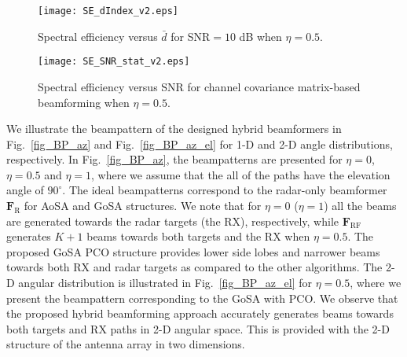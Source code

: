 \documentclass[journal,10pt]{IEEEtran}
\begin{document}
	
	
	\begin{figure}[t]
		\centering
		{\texttt{[image: SE\_dIndex\_v2.eps]} } 
		\caption{\color{black}Spectral efficiency versus $\bar{d}$ for SNR$=10$ dB when $\eta = 0.5$. 
		}
		\label{fig_SE_SNR_dbar}
	\end{figure}
	
	
	
	
	
	\begin{figure}[t]
		\centering
		{\texttt{[image: SE\_SNR\_stat\_v2.eps]} } 
		\caption{\color{black}Spectral efficiency versus SNR for channel covariance matrix-based beamforming when $\eta = 0.5$. 
		}
		\label{fig_SE_SNR_CCM}
	\end{figure}
	
	
	We illustrate the beampattern of the designed hybrid beamformers in Fig.~\ref{fig_BP_az} and Fig.~\ref{fig_BP_az_el} for 1-D and 2-D angle distributions, respectively. In Fig.~\ref{fig_BP_az}, the beampatterns are presented for $\eta = 0$, $\eta = 0.5$ and $\eta = 1$, where we assume that the all of the paths have the elevation angle of $90^\circ$. The ideal beampatterns correspond to the radar-only beamformer $\mathbf{F}_\mathrm{R}$ for AoSA and GoSA structures. We note that for $\eta =0$ ($\eta = 1$) all the beams are generated towards the radar targets (the RX), respectively, while $\mathbf{F}_\mathrm{RF}$ generates $K+1$ beams towards both targets and the RX when $\eta =0.5$. The proposed GoSA PCO structure provides lower side lobes and narrower beams towards both RX and radar targets as compared to the other algorithms. The 2-D angular distribution is illustrated in Fig.~\ref{fig_BP_az_el} for $\eta =0.5$, where we present the beampattern corresponding to the GoSA with PCO. We observe that the proposed hybrid beamforming approach accurately generates beams towards both targets and RX paths in 2-D angular space. This is provided with the 2-D structure of the antenna array in two dimensions.
	
\end{document}
